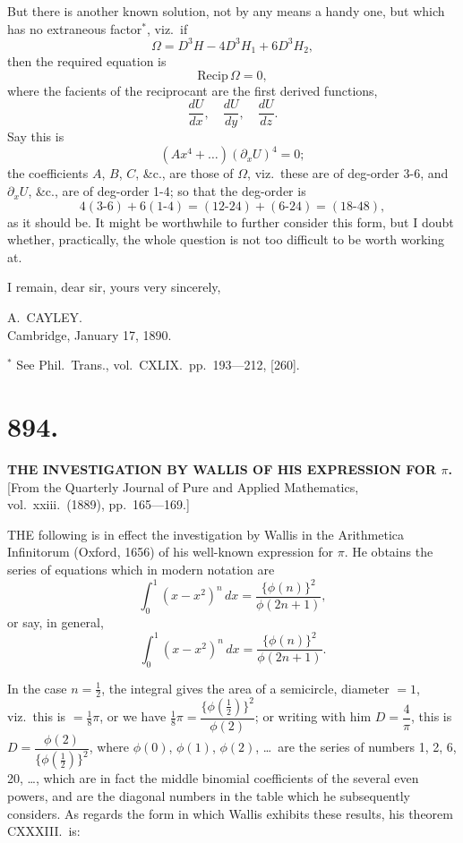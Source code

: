 \documentclass[11pt,a4paper]{book}
\begin{document}
But there is another known solution, not by any means a handy one, but which has no extraneous factor$^*$, viz.\ if
\[
\Omega = D^3H - 4D^3H_1 + 6D^3H_2,
\]
then the required equation is
\[
\text{Recip}\,\Omega = 0,
\]
where the facients of the reciprocant are the first derived functions,
\[
\frac{dU}{dx},\quad \frac{dU}{dy},\quad \frac{dU}{dz}.
\]
Say this is
\[
(Ax^4 + \ldots)(\partial_x U)^4 = 0;
\]
the coefficients $A$, $B$, $C$, \&c., are those of $\Omega$, viz.\ these are of deg-order 3-6, and $\partial_x U$, \&c., are of deg-order 1-4; so that the deg-order is
\[
4(3\text{-}6) + 6(1\text{-}4) = (12\text{-}24) + (6\text{-}24) = (18\text{-}48),
\]
as it should be. It might be worthwhile to further consider this form, but I doubt whether, practically, the whole question is not too difficult to be worth working at.

I remain, dear sir, yours very sincerely,

\begin{flushright}
A.\ CAYLEY.\\
Cambridge, January 17, 1890.
\end{flushright}

$^*$ See Phil.\ Trans., vol.\ CXLIX.\ pp.\ 193---212, [260].


\section*{894.}
\begin{center}
{\large\bfseries THE INVESTIGATION BY WALLIS OF HIS EXPRESSION FOR $\pi$.}\\[0.5em]
\small [From the Quarterly Journal of Pure and Applied Mathematics, vol.\ xxiii.\ (1889), pp.\ 165---169.]
\end{center}

THE following is in effect the investigation by Wallis in the Arithmetica Infinitorum (Oxford, 1656) of his well-known expression for $\pi$. He obtains the series of equations which in modern notation are
\[
\int_0^1 (x-x^2)^n\,dx = \frac{\{\phi(n)\}^2}{\phi(2n+1)},
\]
or say, in general,
\[
\int_0^1 (x-x^2)^n\,dx = \frac{\{\phi(n)\}^2}{\phi(2n+1)}.
\]

In the case $n = \tfrac{1}{2}$, the integral gives the area of a semicircle, diameter $=1$, viz.\ this is $= \tfrac{1}{8}\pi$, or we have $\tfrac{1}{8}\pi = \dfrac{\{\phi(\tfrac{1}{2})\}^2}{\phi(2)}$; or writing with him $D = \dfrac{4}{\pi}$, this is $D = \dfrac{\phi(2)}{\{\phi(\tfrac{1}{2})\}^2}$, where $\phi(0)$, $\phi(1)$, $\phi(2)$, \ldots\ are the series of numbers 1, 2, 6, 20, \ldots, which are in fact the middle binomial coefficients of the several even powers, and are the diagonal numbers in the table which he subsequently considers. As regards the form in which Wallis exhibits these results, his theorem CXXXIII.\ is:
\end{document}
